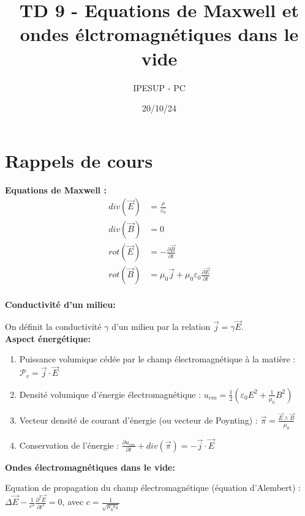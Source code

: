 \documentclass{article}
\title{TD 9 - Equations de Maxwell et ondes élctromagnétiques dans le vide}
\author{IPESUP - PC }
\date{20/10/24}
\begin{document}
\maketitle

\section{Rappels de cours}

\textbf{Equations de Maxwell :}
\begin{align*}
    div(\vec{E}) &= \frac{\rho}{\varepsilon_0} \\
    div(\vec{B}) &= 0 \\
    rot(\vec{E}) &= -\frac{\partial \vec{B}}{\partial t} \\
    rot(\vec{B}) &= \mu_0 \vec{j} + \mu_0 \varepsilon_0 \frac{\partial \vec{E}}{\partial t}\\
\end{align*}

\textbf{Conductivité d'un milieu:}

On définit la conductivité $\gamma$ d'un milieu par la relation $\vec{j} = \gamma \vec{E}$.\\[1cm]



\textbf{Aspect énergétique: }

\begin{enumerate}
  \item Puissance volumique cédée par le champ électromagnétique à la matière : $\mathcal{P}_v = \vec{j} \cdot \vec{E}$
  \item Densité volumique d'énergie électromagnétique : ${u}_{em} = \frac{1}{2}(\varepsilon_0 E^2 + \frac{1}{\mu_0}B^2)$
  \item Vecteur densité de courant d'énergie (ou vecteur de Poynting) : $\vec{\mathcal{\pi}} = \frac{\vec{E} \wedge \vec{B}}{\mu_0}$
  \item Conservation de l'énergie : $\frac{\partial u_{em}}{\partial t} + div(\vec{\mathcal{\pi}}) = -\vec{j} \cdot \vec{E}$ \\[1cm]
\end{enumerate}


\textbf{Ondes électromagnétiques dans le vide: }

Equation de propagation du champ électromagnétique (équation d'Alembert) : $ \Delta \vec{E} - \frac{1}{c^2} \frac{\partial^2 \vec{E}}{\partial t^2} = 0$, avec $c=\frac{1}{\sqrt{\mu_0 \epsilon_0}}$\\
\end{document}

